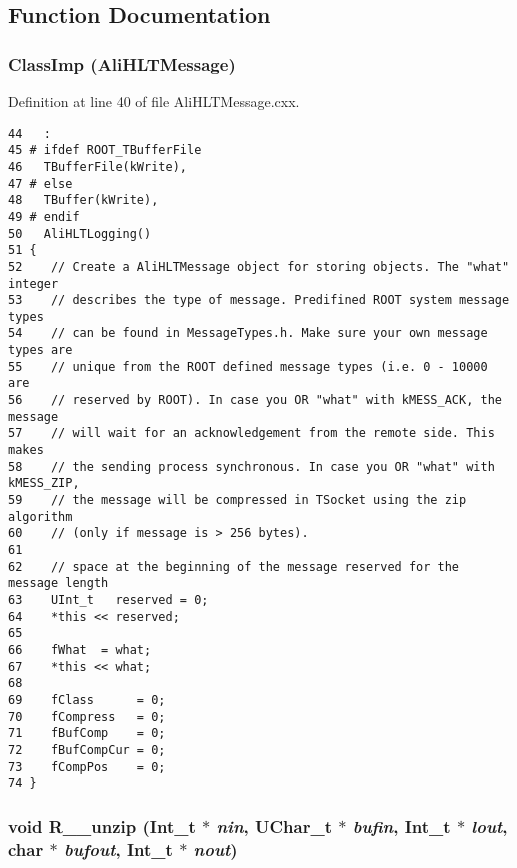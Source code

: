 \subsection{Function Documentation}
\subsubsection{\setlength{\rightskip}{0pt plus 5cm}Class\-Imp ({\bf Ali\-HLTMessage})}\label{AliHLTMessage_8cxx_a3}




Definition at line 40 of file Ali\-HLTMessage.cxx.

\footnotesize\begin{verbatim}44   :
45 # ifdef ROOT_TBufferFile
46   TBufferFile(kWrite),
47 # else
48   TBuffer(kWrite),
49 # endif
50   AliHLTLogging()
51 {
52    // Create a AliHLTMessage object for storing objects. The "what" integer
53    // describes the type of message. Predifined ROOT system message types
54    // can be found in MessageTypes.h. Make sure your own message types are
55    // unique from the ROOT defined message types (i.e. 0 - 10000 are
56    // reserved by ROOT). In case you OR "what" with kMESS_ACK, the message
57    // will wait for an acknowledgement from the remote side. This makes
58    // the sending process synchronous. In case you OR "what" with kMESS_ZIP,
59    // the message will be compressed in TSocket using the zip algorithm
60    // (only if message is > 256 bytes).
61 
62    // space at the beginning of the message reserved for the message length
63    UInt_t   reserved = 0;
64    *this << reserved;
65 
66    fWhat  = what;
67    *this << what;
68 
69    fClass      = 0;
70    fCompress   = 0;
71    fBufComp    = 0;
72    fBufCompCur = 0;
73    fCompPos    = 0;
74 }

\end{verbatim}\normalsize 


\subsubsection{\setlength{\rightskip}{0pt plus 5cm}void R\_\-\_\-unzip (Int\_\-t $\ast$ {\em nin}, UChar\_\-t $\ast$ {\em bufin}, Int\_\-t $\ast$ {\em lout}, char $\ast$ {\em bufout}, Int\_\-t $\ast$ {\em nout})}\label{AliHLTMessage_8cxx_a2}




